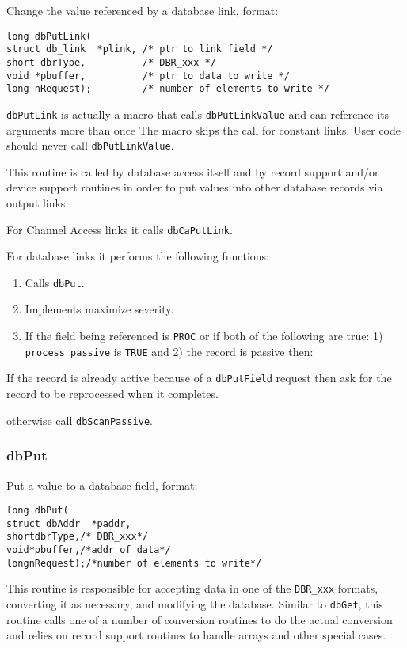 Change the value referenced by a database link, format:



\begin{verbatim}long dbPutLink(
struct db_link  *plink, /* ptr to link field */
short dbrType,          /* DBR_xxx */
void *pbuffer,          /* ptr to data to write */
long nRequest);         /* number of elements to write */
\end{verbatim}\verb|dbPutLink| is actually a macro that calls \verb|dbPutLinkValue| and can reference its arguments more than once The 
macro skips the call for constant links. User code should never call \verb|dbPutLinkValue|.

This routine is called by database access itself and by record support and/or device support routines in order to put values 
into other database records via output links.

For Channel Access links it calls \verb|dbCaPutLink|.

For database links it performs the following functions:

\begin{enumerate}\item Calls \verb|dbPut|.

\item Implements maximize severity.

\item If the field being referenced is \verb|PROC| or if both of the following are true: 1) \verb|process_passive| is \verb|TRUE| and 2) 
the record is passive then:

\end{enumerate}If the record is already active because of a \verb|dbPutField| request then ask for the record to be reprocessed 
when it completes.

otherwise call \verb|dbScanPassive|.

\subsubsection{dbPut}

Put a value to a database field, format:

\begin{verbatim}long dbPut(
struct dbAddr  *paddr,
shortdbrType,/* DBR_xxx*/
void*pbuffer,/*addr of data*/
longnRequest);/*number of elements to write*/
\end{verbatim}This routine is responsible for accepting data in one of the \verb|DBR_xxx| formats, converting it as necessary, and modifying 
the database. Similar to \verb|dbGet|, this routine calls one of a number of conversion routines to do the actual conversion and 
relies on record support routines to handle arrays and other special cases.

